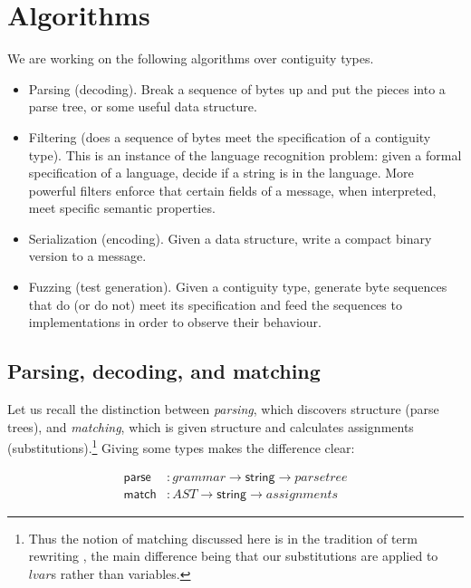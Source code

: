 \documentclass[svgnames]{llncs}
\newcommand{\konst}[1]{\ensuremath{\mathsf{#1}}}
\begin{document}
\section{Algorithms}

We are working on the following algorithms over contiguity types.

\begin{itemize}

\item Parsing (decoding). Break a sequence of bytes up and put the
  pieces into a parse tree, or some useful data structure.

\item Filtering (does a sequence of bytes meet the specification of a
  contiguity type). This is an instance of the language recognition
  problem: given a formal specification of a language, decide if a
  string is in the language. More powerful filters enforce that certain
  fields of a message, when interpreted, meet specific semantic
  properties.

\item Serialization (encoding). Given a data structure, write a compact
  binary version to a message.

\item Fuzzing (test generation). Given a contiguity type, generate
  byte sequences that do (or do not) meet its specification and feed
  the sequences to implementations in order to observe their behaviour.

\end{itemize}

\subsection{Parsing, decoding, and matching}

Let us recall the distinction between \emph{parsing}, which discovers
structure (parse trees), and \emph{matching}, which is given structure
and calculates assignments (substitutions).\footnote{Thus the notion
  of matching discussed here is in the tradition of term rewriting
  \cite{nipkow-trs-book}, the main difference being that our
  substitutions are applied to $\mathit{lvar}$s rather than
  variables.} Giving some types makes the difference clear:

\begin{align}
  \konst{parse} &: \mathit{grammar} \to \konst{string} \to \mathit{parse tree} \\
  \konst{match} &: \mathit{AST} \to \konst{string} \to \mathit{assignments}
\end{align}
\end{document}

